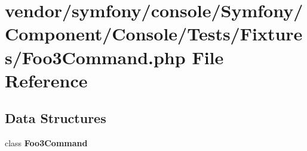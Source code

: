 \section{vendor/symfony/console/\+Symfony/\+Component/\+Console/\+Tests/\+Fixtures/\+Foo3\+Command.php File Reference}
\label{_foo3_command_8php}
\subsection*{Data Structures}
\begin{DoxyCompactItemize}
\item 
class {\bf Foo3\+Command}
\end{DoxyCompactItemize}
